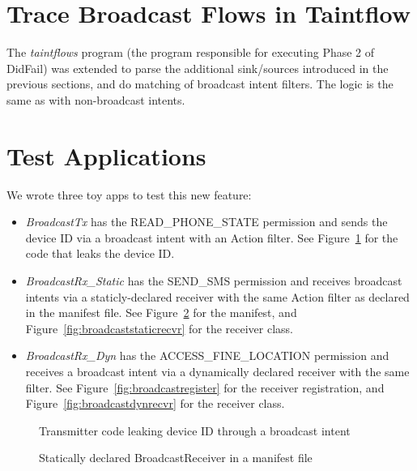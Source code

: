 \section{Trace Broadcast Flows in Taintflow}
The \emph{taintflows} program (the program responsible for executing Phase 2 of DidFail) was extended to parse the additional sink/sources introduced in the previous sections, and do matching of broadcast intent filters. The logic is the same as with non-broadcast intents.

\section{Test Applications}
We wrote three toy apps to test this new feature:

\begin{itemize}
\item{} \emph{BroadcastTx} has the READ\_PHONE\_STATE permission and sends the device ID via a broadcast intent with an Action filter. See Figure~\ref{fig:broadcastleak} for the code that leaks the device ID.

\item{} \emph{BroadcastRx\_Static} has the SEND\_SMS permission and receives broadcast intents via a staticly-declared receiver with the same Action filter as declared in the manifest file.  See Figure~\ref{fig:broadcastmanifest} for the manifest, and Figure~\ref{fig:broadcaststaticrecvr} for the receiver class.

\item{} \emph{BroadcastRx\_Dyn} has the ACCESS\_FINE\_LOCATION permission and receives a broadcast intent via a dynamically declared receiver with the same filter.  See Figure~\ref{fig:broadcastregister} for the receiver registration, and Figure~\ref{fig:broadcastdynrecvr} for the receiver class. 
\end{itemize} 

\begin{figure}[!h]
\begin{framed}

\caption{Transmitter code leaking device ID through a broadcast intent}
\label{fig:broadcastleak}
\end{framed}
\end{figure}

\begin{figure}[!h]
\begin{framed}

\caption{Statically declared BroadcastReceiver in a manifest file}
\label{fig:broadcastmanifest}
\end{framed}
\end{figure}

